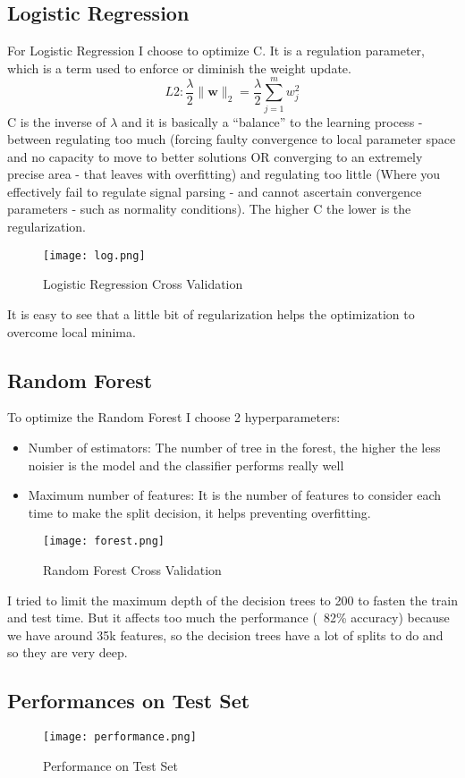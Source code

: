 \documentclass[12pt]{article}
\begin{document}
\subsection{Logistic Regression}
For Logistic Regression I choose to optimize C. It is a regulation parameter, which is a term used to enforce or diminish the weight update.
$$ L2: \frac{\lambda}{2}\lVert \mathbf{w} \lVert_2 = \frac{\lambda}{2} \sum_{j=1}^{m} w_j^2  $$
C is the inverse of $\lambda$ and it is basically a “balance” to the learning process - between regulating too much (forcing faulty convergence to local parameter space and no capacity to move to better solutions OR converging to an extremely precise area - that leaves with overfitting) and regulating too little (Where you effectively fail to regulate signal parsing - and cannot ascertain convergence parameters - such as normality conditions).
The higher C the lower is the regularization.
\begin{figure}[H]
\centering
\texttt{[image: log.png]}
\caption{Logistic Regression Cross Validation}
\end{figure}
It is easy to see that a little bit of regularization helps the optimization to overcome local minima.
\subsection{Random Forest}
To optimize the Random Forest I choose 2 hyperparameters:
\begin{itemize}
    \item Number of estimators: The number of tree in the forest, the higher the less noisier is the model and the classifier performs really well
    \item Maximum number of features: It is the number of features to consider each time to make the split decision, it helps preventing overfitting.
\end{itemize}
\begin{figure}[H]
\centering
\texttt{[image: forest.png]}
\caption{Random Forest Cross Validation}
\end{figure}
I tried to limit the maximum depth of the decision trees to 200 to fasten the train and test time. But it affects too much the performance (~82\% accuracy) because we have around 35k features, so the decision trees have a lot of splits to do and so they are very deep.
\subsection{Performances on Test Set}
\begin{figure}[h!]
\centering
\texttt{[image: performance.png]}
\caption{Performance on Test Set}
\end{figure}
\end{document}

